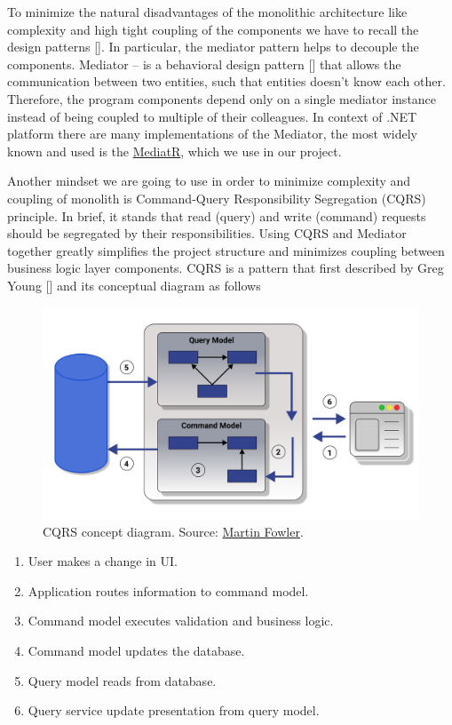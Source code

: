To minimize the natural disadvantages of the monolithic architecture like complexity and high tight coupling of the components
we have to recall the design patterns [\cite{rising1998design}].
In particular, the mediator pattern helps to decouple the components.
Mediator -- is a behavioral design pattern [\cite{rasche2016building}] that allows the communication between two entities,
such that entities doesn't know each other.
Therefore, the program components depend only on a single mediator instance instead of being coupled to multiple of their
colleagues.
In context of .NET platform there are many implementations of the Mediator, the most widely known and used is the
\href{https://github.com/jbogard/MediatR}{MediatR}, which we use in our project.

Another mindset we are going to use in order to minimize complexity and coupling of monolith is Command-Query
Responsibility Segregation (CQRS) principle.
In brief, it stands that read (query) and write (command) requests should be segregated by their responsibilities.
Using CQRS and Mediator together greatly simplifies the project structure and minimizes coupling between business
logic layer components.
CQRS is a pattern that first described by Greg Young [\cite{young2010cqrs}] and its conceptual diagram as follows

\begin{figure}[H]
    \centering
    \includegraphics[width=1\textwidth]{Pictures/05_CQRS_concept_diagram}
    \caption{CQRS concept diagram.
    Source: \href{https://martinfowler.com/bliki/CQRS.html}{Martin Fowler}.}
    \label{fig:figure}
\end{figure}

\begin{enumerate}
    \item User makes a change in UI\@.
    \item Application routes information to command model.
    \item Command model executes validation and business logic.
    \item Command model updates the database.
    \item Query model reads from database.
    \item Query service update presentation from query model.
\end{enumerate}